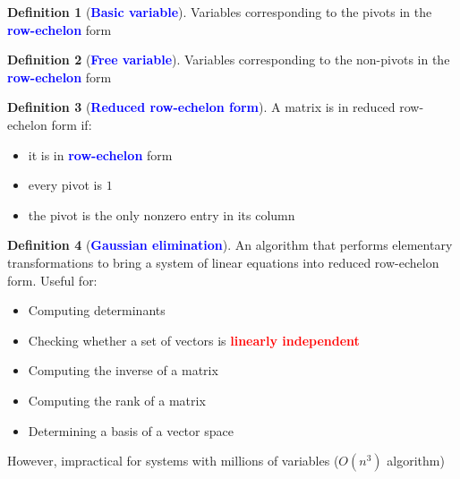 \documentclass[12pt]{article}
\theoremstyle{definition}
\newtheorem{definition}{Definition}[section]
\newcommand{\keyword}[1]{\textbf{\textcolor{red}{#1}}}
\newcommand{\subkeyword}[1]{\textbf{\textcolor{blue}{#1}}}
\begin{document}
            \begin{definition}[\subkeyword{Basic variable}]
                Variables corresponding to the pivots in the 
                \subkeyword{row-echelon} form
            \end{definition}
            \begin{definition}[\subkeyword{Free variable}]
                Variables corresponding to the non-pivots in the 
                \subkeyword{row-echelon} form
            \end{definition}
            \begin{definition}[\subkeyword{Reduced row-echelon form}]
                A matrix is in reduced row-echelon form if:
                \begin{itemize}
                    \item it is in \subkeyword{row-echelon} form
                    \item every pivot is $1$
                    \item the pivot is the only nonzero entry in its column
                \end{itemize} 
            \end{definition}
            \begin{definition}[\subkeyword{Gaussian elimination}]
                An algorithm that performs elementary transformations to bring a
                system of linear equations into reduced row-echelon form. Useful
                for:
                \begin{itemize}
                    \item Computing determinants
                    \item Checking whether a set of vectors is \keyword{linearly independent}
                    \item Computing the inverse of a matrix 
                    \item Computing the rank of a matrix 
                    \item Determining a basis of a vector space
                \end{itemize}
                However, impractical for systems with millions of variables 
                ($O(n^3)$ algorithm)
            \end{definition}
\end{document}

